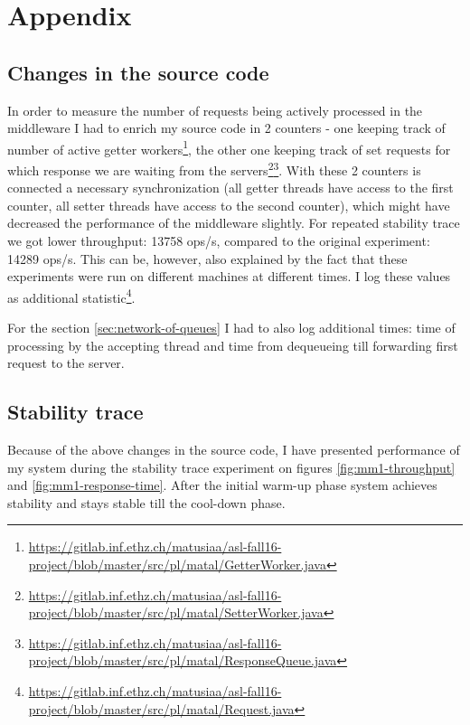 \documentclass[11pt]{article}
\begin{document}
\pagebreak

\section*{Appendix}

\subsection*{Changes in the source code}
In order to measure the number of requests being actively processed in the middleware I had to enrich my source code in 2 counters - one keeping track of number of active getter workers\footnote{\url{https://gitlab.inf.ethz.ch/matusiaa/asl-fall16-project/blob/master/src/pl/matal/GetterWorker.java}}, the other one keeping track of set requests for which response we are waiting from the servers\footnote{\url{https://gitlab.inf.ethz.ch/matusiaa/asl-fall16-project/blob/master/src/pl/matal/SetterWorker.java}}\footnote{\url{https://gitlab.inf.ethz.ch/matusiaa/asl-fall16-project/blob/master/src/pl/matal/ResponseQueue.java}}. With these 2 counters is connected a necessary synchronization (all getter threads have access to the first counter, all setter threads have access to the second counter), which might have decreased the performance of the middleware slightly. For repeated stability trace we got lower throughput: 13758 ops/s, compared to the original experiment: 14289 ops/s. This can be, however, also explained by the fact that these experiments were run on different machines at different times. I log these values as additional statistic\footnote{\url{https://gitlab.inf.ethz.ch/matusiaa/asl-fall16-project/blob/master/src/pl/matal/Request.java}}.

For the section \ref{sec:network-of-queues} I had to also log additional times: time of processing by the accepting thread and time from dequeueing till forwarding first request to the server. 

\subsection*{Stability trace}

Because of the above changes in the source code, I have presented performance of my system during the stability trace experiment on figures \ref{fig:mm1-throughput} and \ref{fig:mm1-response-time}. After the initial warm-up phase system achieves stability and stays stable till the cool-down phase.
\end{document}
